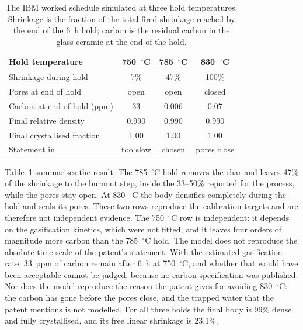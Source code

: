 \begin{table}[!tp]
\centering
\caption{The IBM worked schedule \cite{herron1980method} simulated at three hold temperatures. Shrinkage is the fraction of the total fired shrinkage reached by the end of the 6~h hold; carbon is the residual carbon in the glass-ceramic at the end of the hold.}
\label{tab:ibm}
\footnotesize
\begin{tabular}{@{}lccc@{}}
\toprule
Hold temperature & 750~$^\circ$C & 785~$^\circ$C & 830~$^\circ$C \\
\midrule
Shrinkage during hold & 7\% & 47\% & 100\% \\
Pores at end of hold & open & open & closed \\
Carbon at end of hold (ppm) & 33 & 0.006 & 0.07 \\
Final relative density & 0.990 & 0.990 & 0.990 \\
Final crystallised fraction & 1.00 & 1.00 & 1.00 \\
\midrule
Statement in \cite{herron1980method} & too slow & chosen & pores close \\
\bottomrule
\end{tabular}
\end{table}

Table~\ref{tab:ibm} summarises the result. The 785~$^\circ$C hold removes the char and leaves 47\% of the shrinkage to the burnout step, inside the 33--50\% reported for the process, while the pores stay open. At 830~$^\circ$C the body densifies completely during the hold and seals its pores. These two rows reproduce the calibration targets and are therefore not independent evidence. The 750~$^\circ$C row is independent: it depends on the gasification kinetics, which were not fitted, and it leaves four orders of magnitude more carbon than the 785~$^\circ$C hold. The model does not reproduce the absolute time scale of the patent's statement. With the estimated gasification rate, 33~ppm of carbon remain after 6~h at 750~$^\circ$C, and whether that would have been acceptable cannot be judged, because no carbon specification was published. Nor does the model reproduce the reason the patent gives for avoiding 830~$^\circ$C: the carbon has gone before the pores close, and the trapped water that the patent mentions is not modelled. For all three holds the final body is 99\% dense and fully crystallised, and its free linear shrinkage is 23.1\%.

